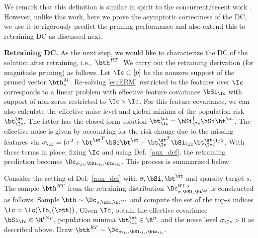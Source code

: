 {We remark that this definition is similar in  spirit to the concurrent/recent work \cite{li2020exploring}. However, unlike this work, here we prove the asymptotic correctness of the DC, we use it to rigorously predict the pruning performance and also extend this to retraining DC as discussed next.} 

\noindent \textbf{Retraining DC.} As the next step, we would like to characterize the DC of the solution after retraining, i.e.,~$\bth^{RT}$. We carry out the retraining derivation (for magnitude pruning) as follows. Let $\Ic\subset[p]$ be the nonzero support of the pruned vector $\bth^M_s$. Re-solving \eqref{eq:ERM} restricted to the features over $\Ic$ corresponds to a linear problem with effective feature covariance $\bSi_\Ic$ with support of non-zeros restricted to $\Ic\times \Ic$. For this feature covariance, we can also calculate the effective noise level and global minima of the population risk $\bt^\st_\Ic$. The latter has the closed-form solution $\bt^\st_\Ic=\bSi_\Ic^\dagger\bSi\bt^\st$. The effective noise is given by accounting for the risk change due to the missing features via $\sigma_\Ic=(\sigma^2+{\bt^\st}^T\bSi\bt^\st-{\bt^\st_\Ic}^T\bSi_\Ic\bt^\st_\Ic)^{1/2}$. With these terms in place, fixing $\Ic$ and using Def.~\ref{aux_def}, the retraining prediction becomes $\Dc_{\sigma_{\Ic},\bSi_{\Ic},\bts_\Ic}$. This process is summarized below.
\begin{definition}[Retraining DC] \label{RT_def}Consider the setting of Def.~\ref{aux_def} with $\sigma,\bSi,\bt^\st$ and sparsity target $s$. The sample $\bth^{RT}$ from the retraining distribution $\Dc^{\text{RT,s}}_{\sigma,\bSi,\bt^\st}$ is constructed as follows. Sample $\bth\sim \Dc_{\sigma,\bSi,\bt^\st}$ and compute the set of the top-$s$ indices $\Ic=\Ic(\Tb_s(\bth))$. Given $\Ic$, obtain the effective covariance $\bSi_\Ic\in\R^{p\times p}$, population minima $\bt^\st_\Ic\in\R^p$, and the noise level $\sigma_{\Ic}>0$ as described above. Draw $\bth^{RT}\sim\Dc_{\sigma_{\Ic},\bSi_{\Ic},\bts_\Ic}$.

\end{definition}
